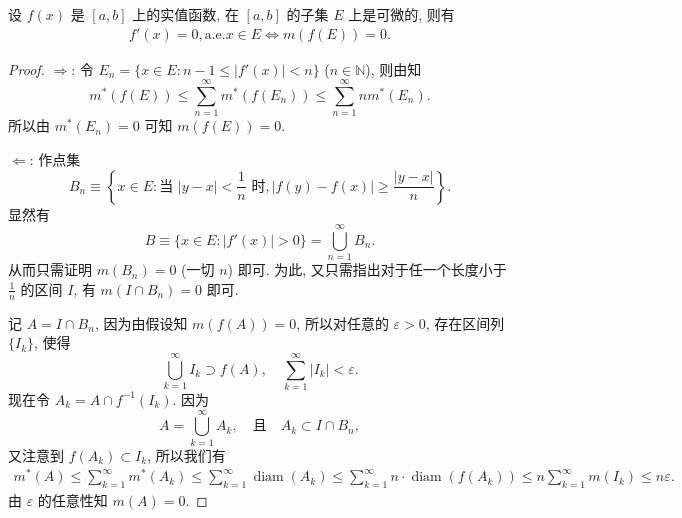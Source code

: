 \documentclass[../../main.tex]{subfiles}%
\begin{document}
\begin{theorem}\label{theorem:实变函数--定理5.21}
设 $f(x)$ 是 $[a,b]$ 上的实值函数, 在 $[a,b]$ 的子集 $E$ 上是可微的, 则有
\begin{align*}
f'(x)=0, \text{a.e.} x\in E\iff m(f(E))=0.
\end{align*}
\end{theorem}
\begin{proof}

$\Longrightarrow$: 令 $E_n = \{x\in E: n-1\leqslant|f'(x)|<n\}$ ($n\in\mathbb{N}$), 则由知
\[
m^*(f(E)) \leqslant \sum_{n=1}^{\infty} m^*(f(E_n)) \leqslant \sum_{n=1}^{\infty} n m^*(E_n).
\]
所以由 $m^*(E_n)=0$ 可知 $m(f(E))=0$.

$\Longleftarrow$: 作点集
\[
B_n \equiv \left\{x\in E: \text{当 } |y-x|<\frac{1}{n} \text{ 时}, |f(y)-f(x)|\geqslant\frac{|y-x|}{n}\right\}.
\]
显然有
\[
B \equiv \{x\in E: |f'(x)|>0\} = \bigcup_{n=1}^{\infty} B_n.
\]
从而只需证明 $m(B_n)=0$ (一切 $n$) 即可. 为此, 又只需指出对于任一个长度小于 $\frac{1}{n}$ 的区间 $I$, 有 $m(I\cap B_n)=0$ 即可.

记 $A=I\cap B_n$, 因为由假设知 $m(f(A))=0$, 所以对任意的 $\varepsilon>0$, 存在区间列 $\{I_k\}$, 使得
\[
\bigcup_{k=1}^{\infty} I_k \supset f(A), \quad \sum_{k=1}^{\infty} |I_k| < \varepsilon.
\]
现在令 $A_k = A\cap f^{-1}(I_k)$. 因为
\[
A = \bigcup_{k=1}^{\infty} A_k, \quad \text{且} \quad A_k \subset I\cap B_n,
\]
又注意到 $f(A_k)\subset I_k$, 所以我们有
\begin{align*}
m^*(A) \leqslant \sum_{k=1}^{\infty} m^*(A_k) \leqslant \sum_{k=1}^{\infty} \operatorname{diam}(A_k) 
\leqslant \sum_{k=1}^{\infty} n \cdot \operatorname{diam}(f(A_k)) \leqslant n \sum_{k=1}^{\infty} m(I_k) \leqslant n\varepsilon.
\end{align*}
由 $\varepsilon$ 的任意性知 $m(A)=0$.

\end{proof}
\end{document}
